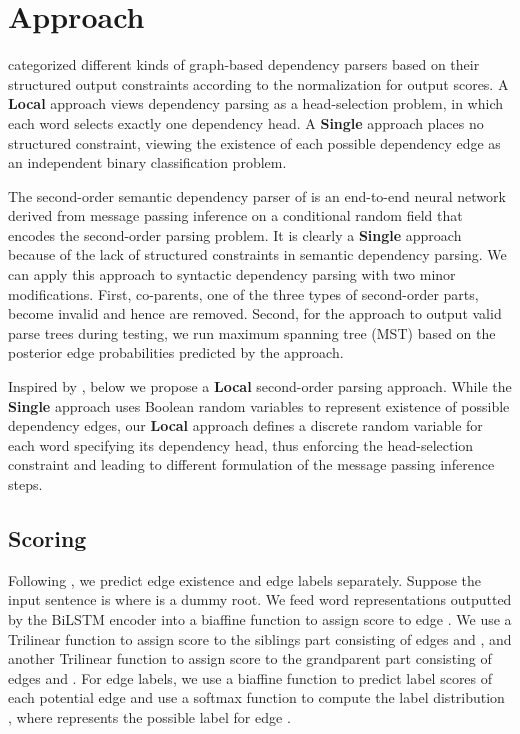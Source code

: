 \documentclass[11pt,a4paper]{article}
\begin{document}
\section{Approach}
\citet{zhang-etal-2019-empirical} categorized different kinds of graph-based dependency parsers based on their structured output constraints according to the normalization for output scores. A \textbf{Local} approach views dependency parsing as a head-selection problem, in which each word selects exactly one dependency head. A \textbf{Single} approach places no structured constraint, viewing the existence of each possible dependency edge as an independent binary classification problem. 

The second-order semantic dependency parser of \citet{wang-etal-2019-second} is an end-to-end neural network derived from message passing inference on a conditional random field that encodes the second-order parsing problem. It is clearly a \textbf{Single} approach because of the lack of structured constraints in semantic dependency parsing. We can apply this approach to syntactic dependency parsing with two minor modifications. First, co-parents, one of the three types of second-order parts, become invalid and hence are removed. Second, for the approach to output valid parse trees during testing, we run maximum spanning tree (MST) \cite{mcdonald-etal-2005-non} based on the posterior edge probabilities predicted by the approach. 

Inspired by \citet{wang-etal-2019-second}, below we propose a \textbf{Local} second-order parsing approach.
While the \textbf{Single} approach uses Boolean random variables to represent existence of possible dependency edges, our \textbf{Local} approach defines a discrete random variable for each word specifying its dependency head, thus enforcing the head-selection constraint and leading to different formulation of the message passing inference steps.

\subsection{Scoring}
Following \citet{dozat2016deep}, we predict edge existence and edge labels separately. Suppose the input sentence is  where  is a dummy root. We feed word representations outputted by the BiLSTM encoder into a biaffine function to assign score  to edge . We use a Trilinear function to assign score  to the siblings part consisting of edges  and , and another Trilinear function to assign score  to the grandparent part consisting of edges  and . For edge labels, we use a biaffine function to predict label scores of each potential edge and use a softmax function to compute the label distribution , where  represents the possible label for edge .
\end{document}
